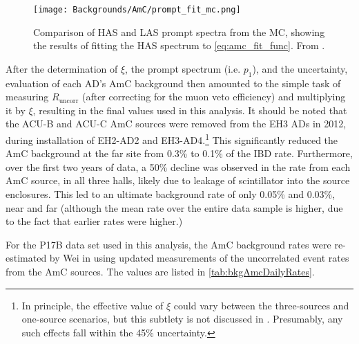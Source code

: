 \documentclass[../thesis.tex]{subfiles}
\begin{document}
\begin{figure}[ht]
  \texttt{[image: Backgrounds/AmC/prompt\_fit\_mc.png]}
  \caption{Comparison of HAS and LAS prompt spectra from the MC, showing the results of fitting the HAS spectrum to \autoref{eq:amc_fit_func}. From \cite{Gu_2016}.}
  \label{fig:amc_prompt_fit_mc}
\end{figure}

After the determination of $\xi$, the prompt spectrum (i.e. $p_1$), and the uncertainty, evaluation of each AD's AmC background then amounted to the simple task of measuring $R_{\mathrm{uncorr}}$ (after correcting for the muon veto efficiency) and multiplying it by $\xi$, resulting in the final values used in this analysis. It should be noted that the ACU-B and ACU-C AmC sources were removed from the EH3 ADs in 2012, during installation of EH2-AD2 and EH3-AD4.\footnote{In principle, the effective value of $\xi$ could vary between the three-sources and one-source scenarios, but this subtlety is not discussed in \cite{Gu_2016}. Presumably, any such effects fall within the 45\% uncertainty.} This significantly reduced the AmC background at the far site from 0.3\% to 0.1\% of the IBD rate. Furthermore, over the first two years of data, a 50\% decline was observed in the rate from each AmC source, in all three halls, likely due to leakage of scintillator into the source enclosures. This led to an ultimate background rate of only 0.05\% and 0.03\%, near and far (although the mean rate over the entire data sample is higher, due to the fact that earlier rates were higher.)

For the P17B data set used in this analysis, the AmC background rates were re-estimated by Wei in \cite{lianghongBkg} using updated measurements of the uncorrelated event rates from the AmC sources. The values are listed in \autoref{tab:bkgAmcDailyRates}.

\begin{table}[ht]
  \caption{AmC background rates for the P17B data set \cite{lianghongBkg}.}
  \label{tab:bkgAmcDailyRates}
\end{table}
\end{document}

